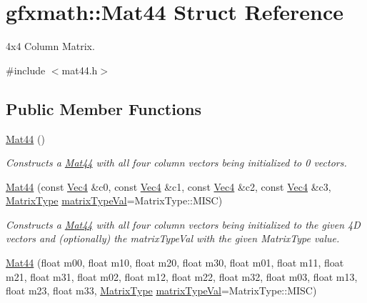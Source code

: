 \hypertarget{structgfxmath_1_1_mat44}{}\section{gfxmath\+:\+:Mat44 Struct Reference}
\label{structgfxmath_1_1_mat44}


4x4 Column Matrix.  




{\ttfamily \#include $<$mat44.\+h$>$}

\subsection*{Public Member Functions}
\begin{DoxyCompactItemize}
\item 
\hyperlink{structgfxmath_1_1_mat44_a5aa0634a6c95cfae7b4680777c625294}{Mat44} ()
\begin{DoxyCompactList}\small\item\em Constructs a \hyperlink{structgfxmath_1_1_mat44}{Mat44} with all four column vectors being initialized to 0 vectors. \end{DoxyCompactList}\item 
\hyperlink{structgfxmath_1_1_mat44_a1e96437c9bcc0cc851bf55d25e9f1bc3}{Mat44} (const \hyperlink{structgfxmath_1_1_vec4}{Vec4} \&c0, const \hyperlink{structgfxmath_1_1_vec4}{Vec4} \&c1, const \hyperlink{structgfxmath_1_1_vec4}{Vec4} \&c2, const \hyperlink{structgfxmath_1_1_vec4}{Vec4} \&c3, \hyperlink{namespacegfxmath_a6c8951c82aec5015dd6806affb4c8d03}{Matrix\+Type} \hyperlink{structgfxmath_1_1_mat44_a523cda94e6f5b2df5276d821b3471605}{matrix\+Type\+Val}=Matrix\+Type\+::\+M\+I\+S\+C)
\begin{DoxyCompactList}\small\item\em Constructs a \hyperlink{structgfxmath_1_1_mat44}{Mat44} with all four column vectors being initialized to the given 4\+D vectors and (optionally) the matrix\+Type\+Val with the given Matrix\+Type value. \end{DoxyCompactList}\item 
\hyperlink{structgfxmath_1_1_mat44_a72333b57344418b1a2e2563134bc2b52}{Mat44} (float m00, float m10, float m20, float m30, float m01, float m11, float m21, float m31, float m02, float m12, float m22, float m32, float m03, float m13, float m23, float m33, \hyperlink{namespacegfxmath_a6c8951c82aec5015dd6806affb4c8d03}{Matrix\+Type} \hyperlink{structgfxmath_1_1_mat44_a523cda94e6f5b2df5276d821b3471605}{matrix\+Type\+Val}=Matrix\+Type\+::\+M\+I\+S\+C)

\end{DoxyCompactItemize}
